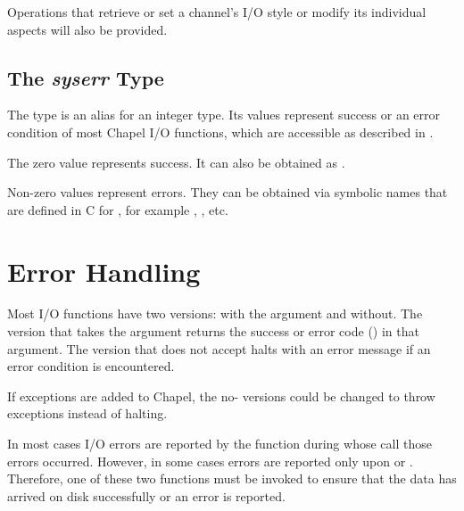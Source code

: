 \begin{future}
Operations that retrieve or set a channel's I/O style
or modify its individual aspects will also be provided.
\end{future}


\subsection{The {\em syserr} Type}
\label{IO_syserr_type}

The  type is an alias for an integer type.
Its values represent success or an error condition of most Chapel I/O
functions, which are accessible as described in .

The zero value represents success. It can also be obtained as .

Non-zero values represent errors. They can be obtained via symbolic
names that are defined in C for , for example
, , etc.



\section{Error Handling}
\label{IO_error_handling}

Most I/O functions have two versions: with the 
argument and without. The version that takes the  argument
returns the success or error code () in that argument.
The version that does not accept  halts with an error message
if an error condition is encountered.

\begin{future}
If exceptions are added to Chapel, the no- versions
could be changed to throw exceptions instead of halting.
\end{future}

In most cases I/O errors are reported by the function during whose
call those errors occurred. However, in some cases errors are
reported only upon  
or  .
Therefore, one of these two functions must be invoked to ensure
that the data has arrived on disk successfully or an error is reported.



